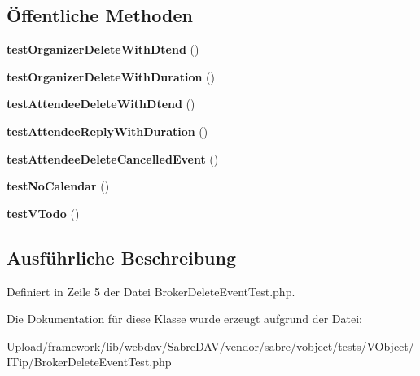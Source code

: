 \subsection*{Öffentliche Methoden}
\begin{DoxyCompactItemize}
\item 
\mbox{\label{class_sabre_1_1_v_object_1_1_i_tip_1_1_broker_delete_event_test_a6d5ad4574945a5d6d3579db9a396facc}} 
{\bfseries test\+Organizer\+Delete\+With\+Dtend} ()
\item 
\mbox{\label{class_sabre_1_1_v_object_1_1_i_tip_1_1_broker_delete_event_test_a446695fafb32b543da3c625cfdfc9976}} 
{\bfseries test\+Organizer\+Delete\+With\+Duration} ()
\item 
\mbox{\label{class_sabre_1_1_v_object_1_1_i_tip_1_1_broker_delete_event_test_acd873ce304bb23350100720ef96056a4}} 
{\bfseries test\+Attendee\+Delete\+With\+Dtend} ()
\item 
\mbox{\label{class_sabre_1_1_v_object_1_1_i_tip_1_1_broker_delete_event_test_ac0761b07e3e8469154ef169620c9d380}} 
{\bfseries test\+Attendee\+Reply\+With\+Duration} ()
\item 
\mbox{\label{class_sabre_1_1_v_object_1_1_i_tip_1_1_broker_delete_event_test_ab33efb6313bcc9020c5d491cb31595ec}} 
{\bfseries test\+Attendee\+Delete\+Cancelled\+Event} ()
\item 
\mbox{\label{class_sabre_1_1_v_object_1_1_i_tip_1_1_broker_delete_event_test_a82c8e3aa46420e4131fb15cb6f872e28}} 
{\bfseries test\+No\+Calendar} ()
\item 
\mbox{\label{class_sabre_1_1_v_object_1_1_i_tip_1_1_broker_delete_event_test_abddee9931bc9ac31d5e2c3b5a0e2eea8}} 
{\bfseries test\+V\+Todo} ()
\end{DoxyCompactItemize}


\subsection{Ausführliche Beschreibung}


Definiert in Zeile 5 der Datei Broker\+Delete\+Event\+Test.\+php.



Die Dokumentation für diese Klasse wurde erzeugt aufgrund der Datei\+:\begin{DoxyCompactItemize}
\item 
Upload/framework/lib/webdav/\+Sabre\+D\+A\+V/vendor/sabre/vobject/tests/\+V\+Object/\+I\+Tip/Broker\+Delete\+Event\+Test.\+php\end{DoxyCompactItemize}
